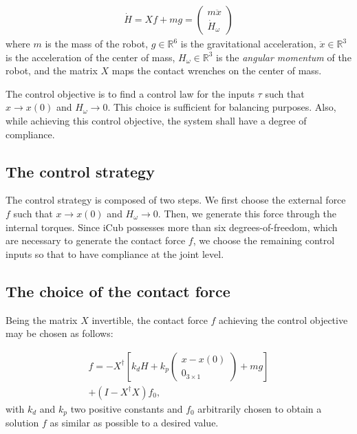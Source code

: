 \documentclass[final,5p,twocolumn]{elsarticle}
\begin{document}
\begin{eqnarray} 
    {\dot H}  =   X f + mg 
     = \begin{pmatrix} m \ddot{x} \\ \dot{H}_\omega  \end{pmatrix} \label{eq:constraintsSi}
\end{eqnarray}
where $m$ is the mass of the robot, $g \in \mathbb{R}^6$ is the gravitational acceleration, $\ddot{x} \in \mathbb{R}^3 $ 
is the acceleration of the center of mass, $H_\omega \in \mathbb{R}^3$ is the \emph{angular momentum} of the robot, and the matrix $X$ maps the contact wrenches on the center of mass.

The control objective is to find a control law for the inputs $\tau$ such that $x \rightarrow x(0)$ and $H_\omega \rightarrow 0$. This choice is sufficient for balancing purposes. Also, while achieving this control objective, the system shall have a degree of compliance.

\subsection{The control strategy}
The control strategy is composed of two steps. We first choose the external force $f$ such that $x \rightarrow x(0)$ and $H_\omega \rightarrow 0$. Then, we generate this force through the internal torques. Since iCub possesses more than six degrees-of-freedom, which are necessary to generate the contact force $f$, we choose the remaining control inputs so that to have compliance at the joint level.

\subsection{The choice of the contact force}

Being the matrix $X$ invertible, the contact force $f$ achieving the control objective may be chosen as follows:

\begin{multline} 
    \label{fd}
   f = -X^{\dagger}\left[k_d H + k_p\begin{pmatrix} x-x(0) \\ 0_{3\times1}  \end{pmatrix} + mg\right] \\ + \left( I - X^{\dagger} X \right) f_0, 
\end{multline}
 with $k_d$ and $k_p$ two positive constants and $f_0$ arbitrarily chosen to obtain a solution $f$ as similar as possible to a desired value.
 
\end{document}
